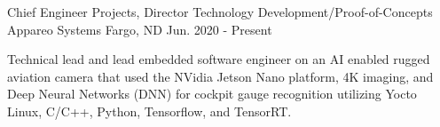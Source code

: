 

\begin{cventries}

  \cventry
    {Chief Engineer Projects, Director Technology Development/Proof-of-Concepts} %
    {Appareo Systems} %
    {Fargo, ND} %
    {Jun. 2020 - Present} %
    {
      \begin{cvitems} %
        \item {Technical lead and lead embedded software engineer on an AI enabled rugged aviation camera that used the NVidia Jetson Nano platform, 4K imaging, and Deep Neural Networks (DNN) for cockpit gauge recognition utilizing Yocto Linux, C/C++, Python, Tensorflow, and TensorRT.}
      \end{cvitems}
    }



\end{cventries}

